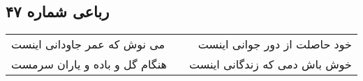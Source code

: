 \begin{center}
\section*{رباعی شماره ۴۷}
\label{sec:sh047}
\begin{longtable}{l p{0.5cm} r}
می نوش که عمر جاودانی اینست
&&
خود حاصلت از دور جوانی اینست
\\
هنگام گل و باده و یاران سرمست
&&
خوش باش دمی که زندگانی اینست
\\
\end{longtable}
\end{center}
